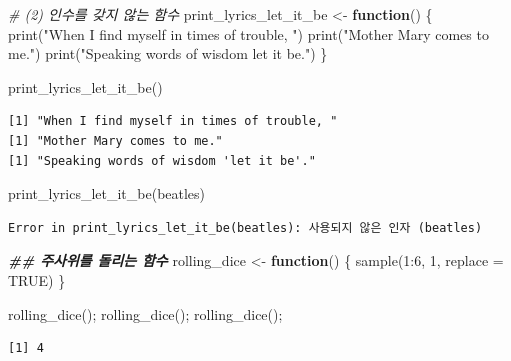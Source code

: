 \documentclass[
  11pt,
]{krantz}
\newenvironment{Shaded}{\begin{snugshade}}{\end{snugshade}}
\newcommand{\AttributeTok}[1]{\textcolor[rgb]{0.61,0.61,0.61}{#1}}
\newcommand{\CommentTok}[1]{\textcolor[rgb]{0.37,0.37,0.37}{\textit{#1}}}
\newcommand{\ConstantTok}[1]{\textcolor[rgb]{0,0,0}{#1}}
\newcommand{\ControlFlowTok}[1]{\textcolor[rgb]{0.27,0.27,0.27}{\textbf{#1}}}
\newcommand{\DecValTok}[1]{\textcolor[rgb]{0.06,0.06,0.06}{#1}}
\newcommand{\DocumentationTok}[1]{\textcolor[rgb]{0.37,0.37,0.37}{\textbf{\textit{#1}}}}
\newcommand{\FunctionTok}[1]{\textcolor[rgb]{0,0,0}{#1}}
\newcommand{\NormalTok}[1]{#1}
\newcommand{\OtherTok}[1]{\textcolor[rgb]{0.37,0.37,0.37}{#1}}
\newcommand{\SpecialCharTok}[1]{\textcolor[rgb]{0,0,0}{#1}}
\newcommand{\StringTok}[1]{\textcolor[rgb]{0.5,0.5,0.5}{#1}}
\begin{document}
\begin{Shaded}
\begin{Highlighting}[]
\CommentTok{\# (2) 인수를 갖지 않는 함수}
\NormalTok{print\_lyrics\_let\_it\_be }\OtherTok{\textless{}{-}} \ControlFlowTok{function}\NormalTok{() \{}
  \FunctionTok{print}\NormalTok{(}\StringTok{"When I find myself in times of trouble, "}\NormalTok{)}
  \FunctionTok{print}\NormalTok{(}\StringTok{"Mother Mary comes to me."}\NormalTok{)}
  \FunctionTok{print}\NormalTok{(}\StringTok{"Speaking words of wisdom \textquotesingle{}let it be\textquotesingle{}."}\NormalTok{)}
\NormalTok{\}}

\FunctionTok{print\_lyrics\_let\_it\_be}\NormalTok{()}
\end{Highlighting}
\end{Shaded}

\begin{verbatim}
[1] "When I find myself in times of trouble, "
[1] "Mother Mary comes to me."
[1] "Speaking words of wisdom 'let it be'."
\end{verbatim}

\begin{Shaded}
\begin{Highlighting}[]
\FunctionTok{print\_lyrics\_let\_it\_be}\NormalTok{(beatles)}
\end{Highlighting}
\end{Shaded}

\begin{verbatim}
Error in print_lyrics_let_it_be(beatles): 사용되지 않은 인자 (beatles)
\end{verbatim}

\begin{Shaded}
\begin{Highlighting}[]
\DocumentationTok{\#\# 주사위를 돌리는 함수}
\NormalTok{rolling\_dice }\OtherTok{\textless{}{-}} \ControlFlowTok{function}\NormalTok{() \{}
  \FunctionTok{sample}\NormalTok{(}\DecValTok{1}\SpecialCharTok{:}\DecValTok{6}\NormalTok{, }\DecValTok{1}\NormalTok{, }\AttributeTok{replace =} \ConstantTok{TRUE}\NormalTok{)}
\NormalTok{\}}

\FunctionTok{rolling\_dice}\NormalTok{(); }\FunctionTok{rolling\_dice}\NormalTok{(); }\FunctionTok{rolling\_dice}\NormalTok{(); }
\end{Highlighting}
\end{Shaded}

\begin{verbatim}
[1] 4
\end{verbatim}
\end{document}
